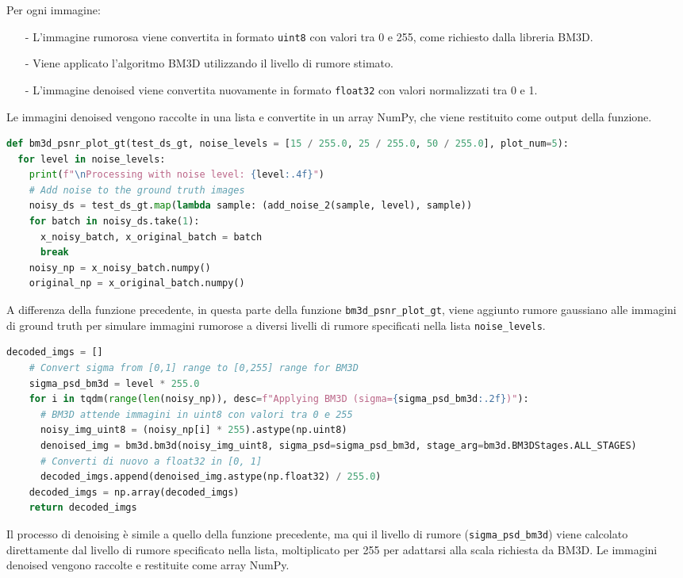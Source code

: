 \documentclass[12pt,a4paper,openright,twoside]{book}
\begin{document}
Per ogni immagine:
\begin{itemize}
    \item[-] L'immagine rumorosa viene convertita in formato \texttt{uint8} con valori tra 0 e 255, come richiesto dalla libreria BM3D.
    \item[-] Viene applicato l'algoritmo BM3D utilizzando il livello di rumore stimato.
    \item[-] L'immagine denoised viene convertita nuovamente in formato \texttt{float32} con valori normalizzati tra 0 e 1.
\end{itemize}
Le immagini denoised vengono raccolte in una lista e convertite in un array NumPy, che viene restituito come output della funzione.

\begin{lstlisting}[language=Python, caption={Definizione di BM3D con rumore definito}, label={lst:bm3d_def_2}]
def bm3d_psnr_plot_gt(test_ds_gt, noise_levels = [15 / 255.0, 25 / 255.0, 50 / 255.0], plot_num=5):
  for level in noise_levels:
    print(f"\nProcessing with noise level: {level:.4f}")
    # Add noise to the ground truth images
    noisy_ds = test_ds_gt.map(lambda sample: (add_noise_2(sample, level), sample))
    for batch in noisy_ds.take(1):
      x_noisy_batch, x_original_batch = batch
      break
    noisy_np = x_noisy_batch.numpy()
    original_np = x_original_batch.numpy()
\end{lstlisting}
A differenza della funzione precedente, in questa parte della funzione \texttt{bm3d\_psnr\_plot\_gt}, viene aggiunto rumore gaussiano alle immagini di ground truth per simulare immagini rumorose a diversi livelli di rumore specificati nella lista \texttt{noise\_levels}.

\begin{lstlisting}[language=Python, caption={Denoising con BM3D}, label={lst:bm3d_denoise_2}]
    decoded_imgs = []
    # Convert sigma from [0,1] range to [0,255] range for BM3D
    sigma_psd_bm3d = level * 255.0
    for i in tqdm(range(len(noisy_np)), desc=f"Applying BM3D (sigma={sigma_psd_bm3d:.2f})"):
      # BM3D attende immagini in uint8 con valori tra 0 e 255
      noisy_img_uint8 = (noisy_np[i] * 255).astype(np.uint8)
      denoised_img = bm3d.bm3d(noisy_img_uint8, sigma_psd=sigma_psd_bm3d, stage_arg=bm3d.BM3DStages.ALL_STAGES)
      # Converti di nuovo a float32 in [0, 1]
      decoded_imgs.append(denoised_img.astype(np.float32) / 255.0)
    decoded_imgs = np.array(decoded_imgs)
    return decoded_imgs
\end{lstlisting}
Il processo di denoising è simile a quello della funzione precedente, ma qui il livello di rumore (\texttt{sigma\_psd\_bm3d}) viene calcolato direttamente dal livello di rumore specificato nella lista, moltiplicato per 255 per adattarsi alla scala richiesta da BM3D.
Le immagini denoised vengono raccolte e restituite come array NumPy.
\end{document}
